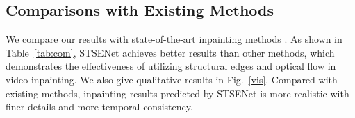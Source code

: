 \subsection{Comparisons with Existing Methods}
We compare our results with state-of-the-art inpainting methods \cite{nazeri2019edgeconnect,wang2019video,Xu_2019_CVPR,Kim_2019_CVPR1}. 
As shown in Table~\ref{tab:com}, STSENet achieves better results than other methods, which demonstrates the effectiveness of utilizing structural edges and optical flow in video inpainting.
We also give qualitative results in Fig.~\ref{vis}. Compared with existing methods, inpainting results predicted by STSENet is more realistic with finer details and more temporal consistency.
\begin{table}[t]
	\caption{Comparisons with existing methods.}\smallskip
	
	\centering
	\label{tab:com}
\end{table}

